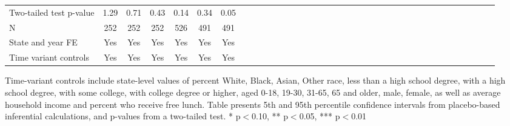 \begin{table}[htbp]
\begin{center}
\begin{threeparttable}
\begin{tabular}{l*{6}{c c c c c c}}
Two-tailed test p-value&     \cellcolor[cmyk]{0.2,0,0,0}   1.29   &    \cellcolor[cmyk]{0.2,0,0,0}    0.71   &   \cellcolor[cmyk]{0.2,0,0,0}     0.43   &        0.14   &        0.34   &     0.05   \\
N                   &         252   &         252   &         252   &         526   &         491   &         491   \\
\midrule
State and year FE                              & Yes   & Yes   & Yes   & Yes   & Yes   & Yes            \\
Time variant controls                  & Yes   & Yes   & Yes   & Yes   & Yes   & Yes            \\
\bottomrule
\end{tabular}
\begin{tablenotes}
\tiny
\item Time-variant controls include state-level values of percent White, Black, Asian, Other race, less than a high school degree, with a high school degree, with some college, with college degree or higher, aged 0-18, 19-30, 31-65, 65 and older, male, female, as well as average household income and percent who receive free lunch.  Table presents 5th and 95th percentile confidence intervals from placebo-based inferential calculations, and p-values from a two-tailed test. * p$<$0.10, ** p$<$0.05, *** p$<$0.01
\end{tablenotes}
\end{threeparttable}
\end{center}
\end{table}
